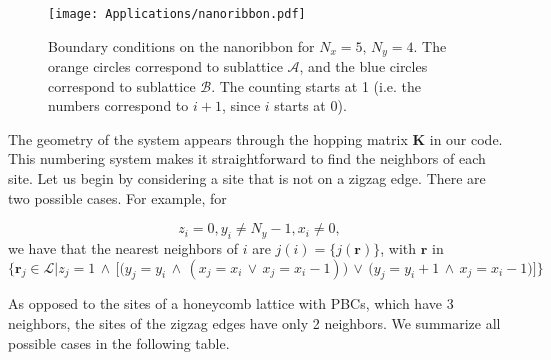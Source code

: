 \begin{figure}[H]
	\centering
\texttt{[image: Applications/nanoribbon.pdf]}
	\caption[Boundary conditions on the nanoribbon.]{Boundary conditions on the nanoribbon for $N_x = 5, \, N_y = 4$. The orange circles correspond to sublattice $\mathcal{A}$, and the blue circles correspond to sublattice $\mathcal{B}$.
	The counting starts at 1 (i.e. the numbers correspond to $i+1$, since $i$ starts at 0).}
	\label{fig:nanoribbon}
\end{figure}

The geometry of the system appears through the hopping matrix $\bm K$ in our code.
This numbering system makes it straightforward to find the neighbors of each site.
Let us begin by considering a site that is not on a zigzag edge.
There are two possible cases. For example, for 

\begin{equation*}
z_i = 0, y_i \neq N_y - 1, x_i \neq 0 ,
\end{equation*}
we have that the nearest neighbors of $i$ are $ j (i) = \{ j ( \bm r) \}$, with $\bm r$ in
\begin{equation*}
\bigg\{ \bm r_j \in \mathcal{L} \bigg| z_j = 1 \,\land\, \bigg[ \bigg( y_j = y_i  \,\land\, ( x_j = x_i \,\lor\, x_j = x_i - 1) \bigg) \,\lor\, \bigg( y_j = y_i + 1  \,\land\, x_j = x_i - 1  \bigg)  \bigg] \bigg\}
\end{equation*}

As opposed to the sites of a honeycomb lattice with \acp{PBC}, which have 3 neighbors, the sites of the zigzag edges have only 2 neighbors.
We summarize all possible cases in the following table.

